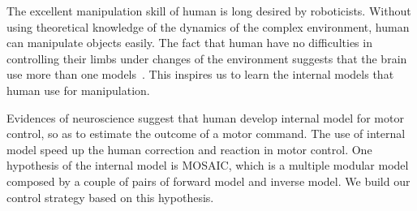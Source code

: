 %




The excellent manipulation skill of human is long desired by roboticists. Without using theoretical knowledge of the dynamics of the complex environment, human can manipulate objects easily. The fact that human have no difficulties in controlling their limbs under changes of the environment suggests that the brain use more than one models~\cite{haruno2001mosaic}. This inspires us to learn the internal models that human use for manipulation.

Evidences of neuroscience suggest that human develop internal model for motor control, so as to estimate the outcome of a motor command. The use of internal model speed up the human correction and reaction in motor control. One hypothesis of the internal model is MOSAIC, which is a multiple modular model composed by a couple of pairs of forward model and inverse model. We build our control strategy based on this hypothesis.

